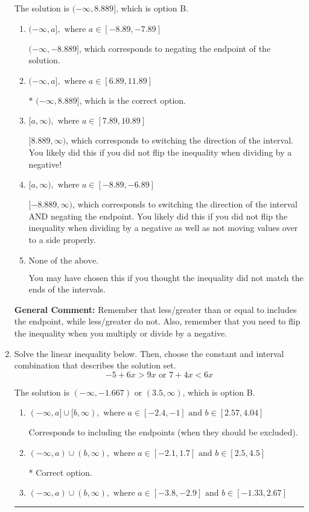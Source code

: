 \documentclass{extbook}[14pt]
\newcommand{\litem}[1]{\item #1

\rule{\textwidth}{0.4pt}}
\begin{document}
\begin{enumerate}
{The solution is \( (-\infty, 8.889] \), which is option B.\begin{enumerate}[label=\Alph*.]
\item \( (-\infty, a], \text{ where } a \in [-8.89, -7.89] \)

 $(-\infty, -8.889]$, which corresponds to negating the endpoint of the solution.
\item \( (-\infty, a], \text{ where } a \in [6.89, 11.89] \)

* $(-\infty, 8.889]$, which is the correct option.
\item \( [a, \infty), \text{ where } a \in [7.89, 10.89] \)

 $[8.889, \infty)$, which corresponds to switching the direction of the interval. You likely did this if you did not flip the inequality when dividing by a negative!
\item \( [a, \infty), \text{ where } a \in [-8.89, -6.89] \)

 $[-8.889, \infty)$, which corresponds to switching the direction of the interval AND negating the endpoint. You likely did this if you did not flip the inequality when dividing by a negative as well as not moving values over to a side properly.
\item \( \text{None of the above}. \)

You may have chosen this if you thought the inequality did not match the ends of the intervals.
\end{enumerate}

\textbf{General Comment:} Remember that less/greater than or equal to includes the endpoint, while less/greater do not. Also, remember that you need to flip the inequality when you multiply or divide by a negative.
}
\litem{
Solve the linear inequality below. Then, choose the constant and interval combination that describes the solution set.
\[ -5 + 6 x > 9 x \text{ or } 7 + 4 x < 6 x \]

The solution is \( (-\infty, -1.667) \text{ or } (3.5, \infty) \), which is option B.\begin{enumerate}[label=\Alph*.]
\item \( (-\infty, a] \cup [b, \infty), \text{ where } a \in [-2.4, -1] \text{ and } b \in [2.57, 4.04] \)

Corresponds to including the endpoints (when they should be excluded).
\item \( (-\infty, a) \cup (b, \infty), \text{ where } a \in [-2.1, 1.7] \text{ and } b \in [2.5, 4.5] \)

 * Correct option.
\item \( (-\infty, a) \cup (b, \infty), \text{ where } a \in [-3.8, -2.9] \text{ and } b \in [-1.33, 2.67] \)


\end{enumerate}}
\end{enumerate}
\end{document}
